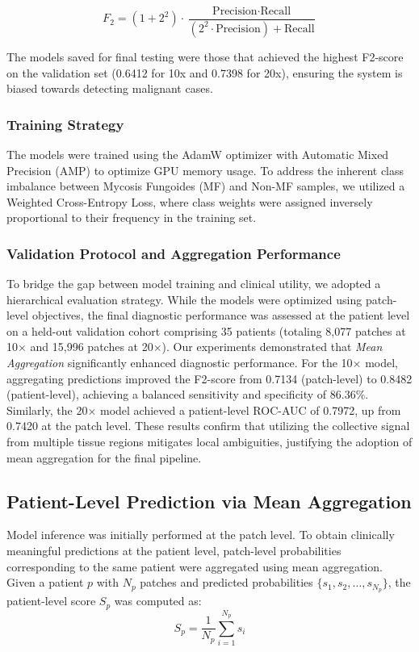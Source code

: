 \documentclass[runningheads]{llncs}
\begin{document}
\begin{equation}
    F_2 = (1 + 2^2) \cdot \frac{\text{Precision} \cdot \text{Recall}}{(2^2 \cdot \text{Precision}) + \text{Recall}}
\label{eq:f2_score}
\end{equation}

The models saved for final testing were those that achieved the highest F2-score on the validation set (0.6412 for 10x and 0.7398 for 20x), ensuring the system is biased towards detecting malignant cases.

\subsubsection{Training Strategy}
The models were trained using the AdamW optimizer with Automatic Mixed Precision (AMP) to optimize GPU memory usage. To address the inherent class imbalance between Mycosis Fungoides (MF) and Non-MF samples, we utilized a Weighted Cross-Entropy Loss, where class weights were assigned inversely proportional to their frequency in the training set.

\subsubsection{Validation Protocol and Aggregation Performance}
To bridge the gap between model training and clinical utility, we adopted a hierarchical evaluation strategy. While the models were optimized using patch-level objectives, the final diagnostic performance was assessed at the patient level on a held-out validation cohort comprising 35 patients (totaling 8,077 patches at 10$\times$ and 15,996 patches at 20$\times$). Our experiments demonstrated that \textit{Mean Aggregation} significantly enhanced diagnostic performance. For the 10$\times$ model, aggregating predictions improved the F2-score from 0.7134 (patch-level) to 0.8482 (patient-level), achieving a balanced sensitivity and specificity of 86.36\%. Similarly, the 20$\times$ model achieved a patient-level ROC-AUC of 0.7972, up from 0.7420 at the patch level. These results confirm that utilizing the collective signal from multiple tissue regions mitigates local ambiguities, justifying the adoption of mean aggregation for the final pipeline.

\subsection{Patient-Level Prediction via Mean Aggregation}
Model inference was initially performed at the patch level. To obtain clinically meaningful predictions at the patient level, patch-level probabilities corresponding to the same patient were aggregated using mean aggregation. Given a patient $p$ with $N_p$ patches and predicted probabilities $\{s_1, s_2, \ldots, s_{N_p}\}$, the patient-level score $S_p$ was computed as:
\begin{equation}
S_p = \frac{1}{N_p} \sum_{i=1}^{N_p} s_i
\end{equation}
\end{document}

